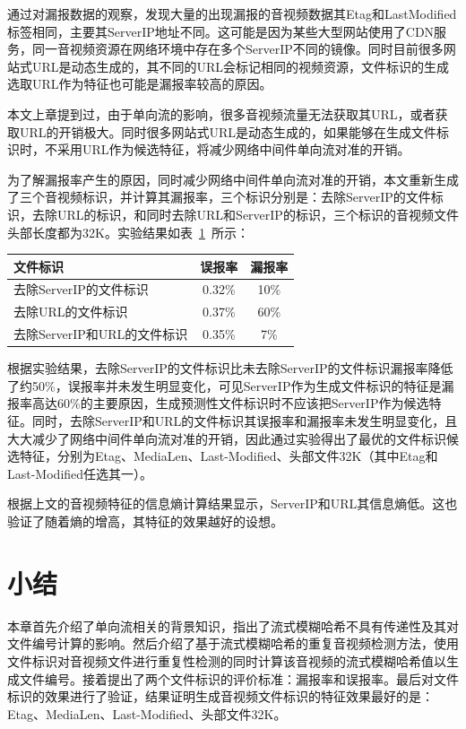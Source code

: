 通过对漏报数据的观察，发现大量的出现漏报的音视频数据其Etag和LastModified标签相同，主要其ServerIP地址不同。这可能是因为某些大型网站使用了CDN服务，同一音视频资源在网络环境中存在多个ServerIP不同的镜像。同时目前很多网站式URL是动态生成的，其不同的URL会标记相同的视频资源，文件标识的生成选取URL作为特征也可能是漏报率较高的原因。

本文上章提到过，由于单向流的影响，很多音视频流量无法获取其URL，或者获取URL的开销极大。同时很多网站式URL是动态生成的，如果能够在生成文件标识时，不采用URL作为候选特征，将减少网络中间件单向流对准的开销。

为了解漏报率产生的原因，同时减少网络中间件单向流对准的开销，本文重新生成了三个音视频标识，并计算其漏报率，三个标识分别是：去除ServerIP的文件标识，去除URL的标识，和同时去除URL和ServerIP的标识，三个标识的音视频文件头部长度都为32K。实验结果如表~\ref{tab:PredictiveDocument}~所示：
\begin{table}[!htbp]
    \label{tab:PredictiveDocument}
    \centering
    \footnotesize%
    \setlength{\tabcolsep}{4pt}%
    \renewcommand{\arraystretch}{1.2}%
    \begin{tabular}{lcc}
        \hline
       文件标识&误报率&漏报率\\
        \hline
		去除ServerIP的文件标识&0.32\%&10\% \\
		去除URL的文件标识&0.37\%&60\% \\
		去除ServerIP和URL的文件标识&0.35\%&7\% \\
        \hline
    \end{tabular}
\end{table}

根据实验结果，去除ServerIP的文件标识比未去除ServerIP的文件标识漏报率降低了约50\%，误报率并未发生明显变化，可见ServerIP作为生成文件标识的特征是漏报率高达60\%的主要原因，生成预测性文件标识时不应该把ServerIP作为候选特征。同时，去除ServerIP和URL的文件标识其误报率和漏报率未发生明显变化，且大大减少了网络中间件单向流对准的开销，因此通过实验得出了最优的文件标识候选特征，分别为Etag、MediaLen、Last-Modified、头部文件32K（其中Etag和Last-Modified任选其一）。

根据上文的音视频特征的信息熵计算结果显示，ServerIP和URL其信息熵低。这也验证了随着熵的增高，其特征的效果越好的设想。
\section{小结}
本章首先介绍了单向流相关的背景知识，指出了流式模糊哈希不具有传递性及其对文件编号计算的影响。然后介绍了基于流式模糊哈希的重复音视频检测方法，使用文件标识对音视频文件进行重复性检测的同时计算该音视频的流式模糊哈希值以生成文件编号。接着提出了两个文件标识的评价标准：漏报率和误报率。最后对文件标识的效果进行了验证，结果证明生成音视频文件标识的特征效果最好的是：Etag、MediaLen、Last-Modified、头部文件32K。
